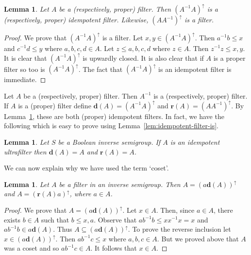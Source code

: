 \documentclass[a4paper]{amsart}
\newtheorem{lemma}[theorem]{Lemma}
\begin{document}
\begin{lemma}\label{lem:d-for-a-filter} Let $A$ be a (respectively, proper) filter.
Then $(A^{-1}A)^{\uparrow}$ is a (respectively, proper) idempotent filter.
Likewise, $(AA^{-1})^{\uparrow}$ is a filter.
\end{lemma}
\begin{proof} We prove that $(A^{-1}A)^{\uparrow}$ is a filter.
Let $x,y \in (A^{-1}A)^{\uparrow}$.
Then $a^{-1}b \leq x$ and $c^{-1}d \leq y$ where $a,b,c,d \in A$.
Let $z \leq a,b,c,d$ where $z \in A$.
Then $z^{-1}z \leq x,y$.
It is clear that $(A^{-1}A)^{\uparrow}$ is upwardly closed.
It is also clear that if $A$ is a proper filter so too is $(A^{-1}A)^{\uparrow}$.
The fact that $(A^{-1}A)^{\uparrow}$ is an idempotent filter is immediate.
\end{proof}

Let $A$ be a (respectively, proper) filter.
Then $A^{-1}$ is a (respectively, proper) filter.
If $A$ is a (proper) filter define 
$\mathbf{d}(A) = (A^{-1}A)^{\uparrow}$ 
and
$\mathbf{r}(A) = (AA^{-1})^{\uparrow}$.
By Lemma~\ref{lem:d-for-a-filter}, these are both (proper) idempotent filters.
In fact, we have the following which is easy to prove using Lemma~\ref{lem:idempotent-filter-is}. 

\begin{lemma}\label{lem:identities-in-bis} Let $S$ be a Boolean inverse semigroup.
If $A$ is an idempotent ultrafilter then $\mathbf{d}(A) = A$ and $\mathbf{r}(A) = A$. 
\end{lemma}

We can now explain why we have used the term `coset'.

\begin{lemma}\label{lem:cosets} Let $A$ be a filter in an inverse semigroup.
Then $A = (a \mathbf{d}(A))^{\uparrow}$ and $A = (\mathbf{r}(A)a)^{\uparrow}$,
where $a \in A$. 
\end{lemma}
\begin{proof} We prove that $A = (a \mathbf{d}(A))^{\uparrow}$.
Let $x \in A$.
Then, since $a \in A$, there exists $b \in A$ such that $b \leq x,a$.
Observe that $ab^{-1}b \leq xx^{-1}x = x$ and $ab^{-1}b \in a\mathbf{d}(A)$.
Thus $A \subseteq (a \mathbf{d}(A))^{\uparrow}$.
To prove the reverse inclusion let $x \in (a \mathbf{d}(A))^{\uparrow}$.
Then $ab^{-1}c \leq x$ where $a,b,c \in A$.
But we proved above that $A$ was a coset and so $ab^{-1}c \in A$.
It follows that $x \in A$.
\end{proof}
\end{document}

